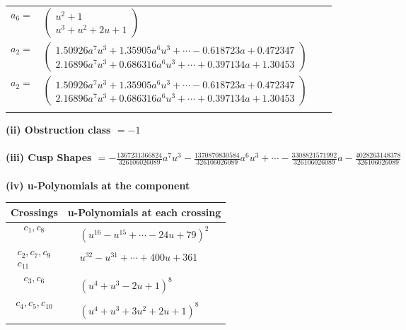 \documentclass[1p]{elsarticle_modified}
\theoremstyle{definition}
\begin{document}
\begin{tabular}{m{7pt} m{180pt} m{7pt} m{180pt} }
\flushright $a_{6}=$&$\begin{pmatrix}u^2+1\\u^3+u^2+2 u+1\end{pmatrix}$ \\
\flushright $a_{2}=$&$\begin{pmatrix}1.50926 a^{7} u^{3}+1.35905 a^{6} u^{3}+\cdots-0.618723 a+0.472347\\2.16896 a^{7} u^{3}+0.686316 a^{6} u^{3}+\cdots+0.397134 a+1.30453\end{pmatrix}$\\ \flushright $a_{2}=$&$\begin{pmatrix}1.50926 a^{7} u^{3}+1.35905 a^{6} u^{3}+\cdots-0.618723 a+0.472347\\2.16896 a^{7} u^{3}+0.686316 a^{6} u^{3}+\cdots+0.397134 a+1.30453\end{pmatrix}$\\&\end{tabular}
\flushleft \textbf{(ii) Obstruction class $= -1$}\\~\\
\flushleft \textbf{(iii) Cusp Shapes $= -\frac{1367231366824}{326106026089} a^7 u^3-\frac{1370870830584}{326106026089} a^6 u^3+\cdots-\frac{3308821571992}{326106026089} a-\frac{4028263148378}{326106026089}$}\\~\\
\newpage\renewcommand{\arraystretch}{1}
\flushleft \textbf{(iv) u-Polynomials at the component}\newline \\
\begin{tabular}{m{50pt}|m{274pt}}
Crossings & \hspace{64pt}u-Polynomials at each crossing \\
\hline $$\begin{aligned}c_{1},c_{8}\end{aligned}$$&$\begin{aligned}
&(u^{16}- u^{15}+\cdots-24 u+79)^{2}
\end{aligned}$\\
\hline $$\begin{aligned}c_{2},c_{7},c_{9}\\c_{11}\end{aligned}$$&$\begin{aligned}
&u^{32}- u^{31}+\cdots+400 u+361
\end{aligned}$\\
\hline $$\begin{aligned}c_{3},c_{6}\end{aligned}$$&$\begin{aligned}
&(u^4+u^3-2 u+1)^8
\end{aligned}$\\
\hline $$\begin{aligned}c_{4},c_{5},c_{10}\end{aligned}$$&$\begin{aligned}
&(u^4+u^3+3 u^2+2 u+1)^8
\end{aligned}$\\
\hline
\end{tabular}\\~\\
\end{document}
